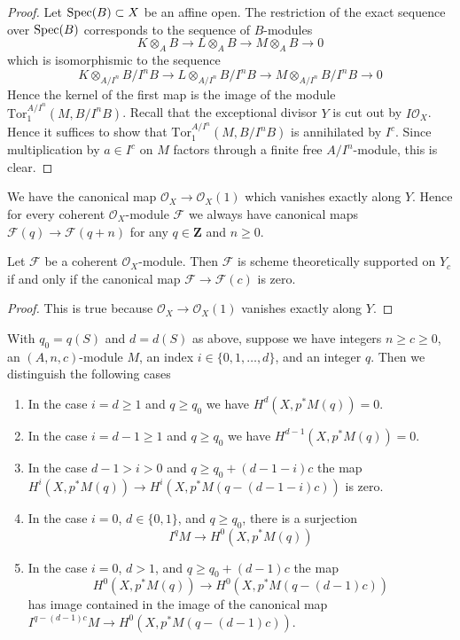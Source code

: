 \begin{proof}
Let $\mathop{\mathrm{Spec}}(B) \subset X$ be an affine open. The restriction of the exact
sequence over $\mathop{\mathrm{Spec}}(B)$ corresponds to the sequence of $B$-modules
$$
K \otimes_A B \to L \otimes_A B \to M \otimes_A B \to 0
$$
which is isomorphismic to the sequence
$$
K \otimes_{A/I^n} B/I^nB \to
L \otimes_{A/I^n} B/I^nB \to
M \otimes_{A/I^n} B/I^nB \to 0
$$
Hence the kernel of the first map is the image of the module
$\text{Tor}_1^{A/I^n}(M, B/I^nB)$. Recall that the exceptional
divisor $Y$ is cut out by $I\mathcal{O}_X$. 
Hence it suffices to show that
$\text{Tor}_1^{A/I^n}(M, B/I^nB)$ is annihilated by $I^c$. Since
multiplication by $a \in I^c$ on $M$ factors through a finite
free $A/I^n$-module, this is clear.
\end{proof}

\noindent
We have the canonical map $\mathcal{O}_X \to \mathcal{O}_X(1)$
which vanishes exactly along $Y$.
Hence for every coherent $\mathcal{O}_X$-module $\mathcal{F}$
we always have canonical maps
$\mathcal{F}(q) \to \mathcal{F}(q + n)$ for any $q \in \mathbf{Z}$
and $n \geq 0$.

\begin{lemma}
\label{lemma-annihilated}
Let $\mathcal{F}$ be a coherent $\mathcal{O}_X$-module.
Then $\mathcal{F}$ is scheme theoretically
supported on $Y_c$ if and only if the canonical map
$\mathcal{F} \to \mathcal{F}(c)$ is zero.
\end{lemma}

\begin{proof}
This is true because $\mathcal{O}_X \to \mathcal{O}_X(1)$
vanishes exactly along $Y$.
\end{proof}

\begin{lemma}
\label{lemma-vanishing-coh-almost-projective}
With $q_0 = q(S)$ and $d = d(S)$ as above, suppose we have
integers $n \geq c \geq 0$, an $(A, n, c)$-module $M$,
an index $i \in \{0, 1, \ldots, d\}$, and an integer $q$.
Then we distinguish the following cases
\begin{enumerate}
\item In the case $i = d \geq 1$ and $q \geq q_0$ we have
$H^d(X, p^*M(q)) = 0$.
\item In the case $i = d - 1 \geq 1$ and $q \geq q_0$ we have
$H^{d - 1}(X, p^*M(q)) = 0$.
\item In the case $d - 1 > i > 0$ and $q \geq q_0 + (d - 1 - i)c$
the map
$H^i(X, p^*M(q)) \to H^i(X, p^*M(q - (d - 1 - i)c))$
is zero.
\item In the case $i = 0$, $d \in \{0, 1\}$, and $q \geq q_0$, there
is a surjection
$$
I^qM \longrightarrow H^0(X, p^*M(q))
$$
\item In the case $i = 0$, $d > 1$, and $q \geq q_0 + (d - 1)c$ the map
$$
H^0(X, p^*M(q)) \to H^0(X, p^*M(q - (d - 1)c))
$$
has image contained in the image of the canonical map
$I^{q - (d - 1)c}M \to H^0(X, p^*M(q - (d - 1)c))$.
\end{enumerate}
\end{lemma}

